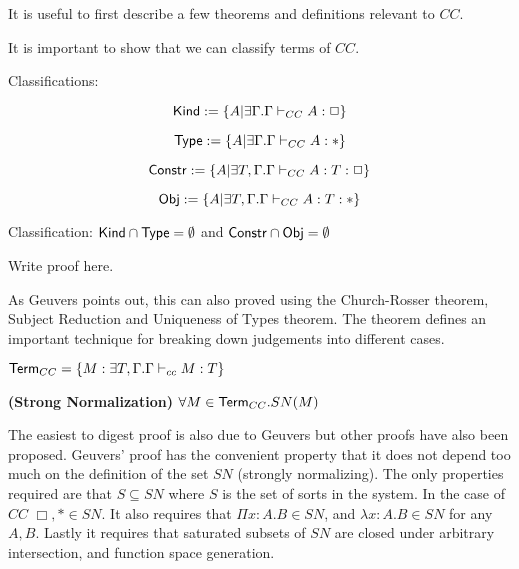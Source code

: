 It is useful to first describe a few theorems and definitions relevant to $CC$.  

It is important to show that we can classify \citep{Geuvers94ashort} terms of $CC$.

\begin{definition}
Classifications:

\[
\mathsf{Kind} := \{ A | \exists \Gamma . \Gamma \vdash_{CC} A : \Box \}
\]

\[
\mathsf{Type} := \{ A | \exists \Gamma . \Gamma \vdash_{CC} A : * \}
\]

\[
\mathsf{Constr} := \{ A | \exists T,\Gamma . \Gamma \vdash_{CC} A : T:\Box \}
\]

\[
\mathsf{Obj} := \{ A | \exists T,\Gamma . \Gamma \vdash_{CC} A : T:* \}
\]

\end{definition}

\begin{theorem}
Classification:
$\mathsf{Kind}\cap \mathsf{Type} = \emptyset$ 
and
$\mathsf{Constr}\cap \mathsf{Obj} = \emptyset$ 
\end{theorem}

Write proof here.

As Geuvers points out, this can also proved using the Church-Rosser theorem, 
Subject Reduction and Uniqueness of Types theorem.  
The theorem defines an important technique for breaking down judgements into
different cases.

\begin{definition}
$ \mathsf{Term}_{CC}  = \{ M : \exists T,\Gamma . \Gamma \vdash_{cc} M : T \}$
\end{definition}

\begin{theorem}
\textbf{(Strong Normalization)} $\forall M \in \mathsf{Term}_{CC}. SN(M)$
\label{cc:cons}
\end{theorem}

The easiest to digest proof is also due to Geuvers \citep{Geuvers94ashort} 
but other proofs have also been proposed.  Geuvers' proof has the convenient
property that it does not depend too much on the definition of the set $SN$ 
(strongly normalizing). The only properties required are that $S \subseteq SN$ 
where $S$ is the set of sorts in the system. In the case of $CC$ $\Box,* \in SN$.
It also requires that $\Pi x : A . B \in SN$, and $\lambda x : A . B \in SN$ 
for any $A,B$.  Lastly it requires that saturated subsets of $SN$ are closed under
arbitrary intersection, and function space generation.

